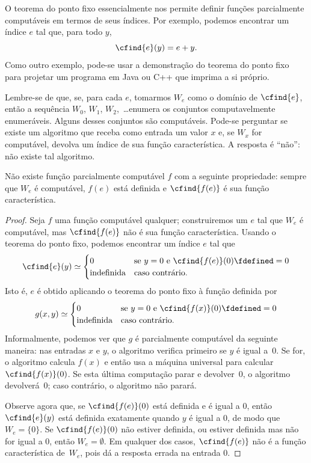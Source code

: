\documentclass[../../../include/open-logic-section]{subfiles}
\begin{document}

O teorema do ponto fixo essencialmente nos permite definir funções
parcialmente computáveis em termos de seus índices. Por exemplo,
podemos encontrar um índice $e$ tal que, para todo $y$,
\[
\cfind{e}(y) = e + y.
\]
Como outro exemplo, pode-se usar a demonstração do teorema do ponto
fixo para projetar um programa em Java ou C++ que imprima a si próprio.

Lembre-se de que, se, para cada $e$, tomarmos $W_e$ como o domínio de
$\cfind{e}$, então a sequência $W_0$, $W_1$, $W_2$,~\dots enumera os
conjuntos computavelmente enumeráveis. Alguns desses conjuntos são
computáveis. Pode-se perguntar se existe um algoritmo que receba como
entrada um valor $x$ e, se $W_x$ for computável, devolva um índice de
sua função característica. A resposta é ``não'': não existe tal
algoritmo.

\begin{thm}
Não existe função parcialmente computável $f$ com a seguinte
propriedade: sempre que $W_e$ é computável, $f(e)$ está definida e
$\cfind{f(e)}$ é sua função característica.
\end{thm}

\begin{proof}
Seja $f$ uma função computável qualquer; construiremos um $e$
tal que $W_e$ é computável, mas $\cfind{f(e)}$ não é sua função
característica. Usando o teorema do ponto fixo, podemos encontrar um
índice $e$ tal que
\[
\cfind{e}(y) \simeq
\begin{cases}
0 & \text{se $y=0$ e $\cfind{f(e)}(0) \fdefined = 0$} \\
\text{indefinida} & \text{caso contrário.}
\end{cases}
\]
Isto é, $e$ é obtido aplicando o teorema do ponto fixo à função
definida por
\[
g(x,y) \simeq
\begin{cases}
0 & \text{se $y=0$ e $\cfind{f(x)}(0) \fdefined = 0$} \\
\text{indefinida} & \text{caso contrário.}
\end{cases}
\]
Informalmente, podemos ver que $g$ é parcialmente computável da
seguinte maneira: nas entradas $x$ e $y$, o algoritmo verifica primeiro
se $y$ é igual a~$0$. Se for, o algoritmo calcula $f(x)$ e então usa
a máquina universal para calcular $\cfind{f(x)}(0)$. Se esta última
computação parar e devolver~$0$, o algoritmo devolverá~$0$; caso
contrário, o algoritmo não parará.

Observe agora que, se $\cfind{f(e)}(0)$ está definida e é igual a $0$,
então $\cfind{e}(y)$ está definida exatamente quando $y$ é igual a $0$,
de modo que $W_e = \{ 0 \}$. Se $\cfind{f(e)}(0)$ não estiver definida,
ou estiver definida mas não for igual a $0$, então
$W_e = \emptyset$. Em qualquer dos casos, $\cfind{f(e)}$ não é a
função característica de~$W_e$, pois dá a resposta errada na entrada
$0$.
\end{proof}
\end{document}
